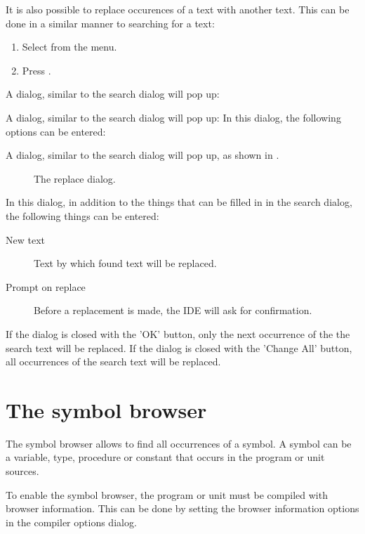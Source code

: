 It is also possible to replace occurences of a text with another text. 
This can be done in a similar manner to searching for a text:
\begin{enumerate}
\item Select  from the menu.
\item Press .
\end{enumerate}
A dialog, similar to the search dialog will pop up:
\begin{htmlonly}
A dialog, similar to the search dialog will pop up:
In this dialog, the following options can be entered:
\end{htmlonly}
\begin{latexonly}
A dialog, similar to the search dialog will pop up, as shown in .
\begin{figure}[ht]
\caption{The replace dialog.}\label{fig:replace}
\ifpdf
{}
\else
{}
\fi
\end{figure}
\end{latexonly}

In this dialog, in addition to the things that can be filled in in the
search dialog, the following things can be entered:
\begin{description}
\item [New text] Text by which found text will be replaced.
\item [Prompt on replace] Before a replacement is made, the IDE will ask for
confirmation.
\end{description}
If the dialog is closed with the 'OK' button, only the next occurrence of
the the search text will be replaced. 
If the dialog is closed with the 'Change All' button, all occurrences of 
the search text will be replaced.

\section{The symbol browser}
\label{se:browser}
The symbol browser allows to find all occurrences of a symbol. A symbol 
can be a variable, type, procedure or constant that occurs in the
program or unit sources.

To enable the symbol browser, the program or unit must be compiled with
browser information. This can be done by setting the browser information
options in the compiler options dialog.

